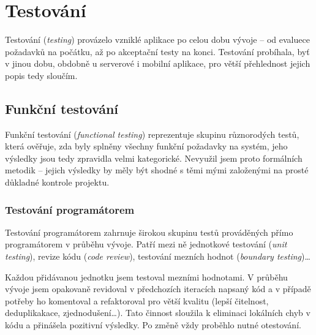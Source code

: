 
\chapter{Testování}
Testování (\textit{testing}) provázelo vzniklé aplikace po celou dobu vývoje -- od evaluece požadavků na počátku, až po akceptační testy na konci. Testování probíhala, byť v jinou dobu, obdobně u serverové i mobilní aplikace, pro větší přehlednost jejich popis tedy sloučím.

\section{Funkční testování}
Funkční testování (\textit{functional testing}) reprezentuje skupinu různorodých testů, která ověřuje, zda byly splněny všechny funkční požadavky na systém, jeho výsledky jsou tedy zpravidla velmi kategorické. Nevyužil jsem proto formálních metodik -- jejich výsledky by měly být shodné s těmi mými založenými na prosté důkladné kontrole projektu.

\subsection{Testování programátorem}
Testování programátorem zahrnuje širokou skupinu testů prováděných přímo programátorem v průběhu vývoje. Patří mezi ně jednotkové testování (\textit{unit testing}), revize kódu (\textit{code review}), testování mezních hodnot (\textit{boundary testing})\dots

Každou přidávanou jednotku jsem testoval mezními hodnotami. V průběhu vývoje jsem opakovaně revidoval v předchozích iteracích napsaný kód a v případě potřeby ho komentoval a refaktoroval pro větší kvalitu (lepší čitelnost, deduplikakace, zjednodušení\dots). Tato činnost sloužila k eliminaci lokálních chyb v kódu a přinášela pozitivní výsledky. Po změně vždy proběhlo nutné otestování.



